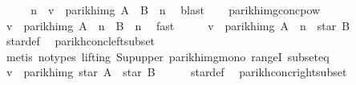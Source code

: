 \begin{isabellebody}
\ \ \isamarkupfalse%
\ \isamarkupfalse%
\ n\ \ {\isachardoublequoteopen}v\ {\isasymin}\ parikh{\isacharunderscore}{\kern0pt}img\ {\isacharparenleft}{\kern0pt}{\isacharparenleft}{\kern0pt}A\ {\isacharat}{\kern0pt}{\isacharat}{\kern0pt}\ B{\isacharparenright}{\kern0pt}\ {\isacharcircum}{\kern0pt}{\isacharcircum}{\kern0pt}\ n{\isacharparenright}{\kern0pt}{\isachardoublequoteclose}\ \isamarkupfalse%
\ blast\isanewline
\ \ \isamarkupfalse%
\ parikh{\isacharunderscore}{\kern0pt}img{\isacharunderscore}{\kern0pt}conc{\isacharunderscore}{\kern0pt}pow\ \isamarkupfalse%
\ {\isachardoublequoteopen}v\ {\isasymin}\ parikh{\isacharunderscore}{\kern0pt}img\ {\isacharparenleft}{\kern0pt}A\ {\isacharcircum}{\kern0pt}{\isacharcircum}{\kern0pt}\ n\ {\isacharat}{\kern0pt}{\isacharat}{\kern0pt}\ B\ {\isacharcircum}{\kern0pt}{\isacharcircum}{\kern0pt}\ n{\isacharparenright}{\kern0pt}{\isachardoublequoteclose}\ \isamarkupfalse%
\ fast\isanewline
\ \ \isamarkupfalse%
\ \isamarkupfalse%
\ {\isachardoublequoteopen}v\ {\isasymin}\ parikh{\isacharunderscore}{\kern0pt}img\ {\isacharparenleft}{\kern0pt}A\ {\isacharcircum}{\kern0pt}{\isacharcircum}{\kern0pt}\ n\ {\isacharat}{\kern0pt}{\isacharat}{\kern0pt}\ star\ B{\isacharparenright}{\kern0pt}{\isachardoublequoteclose}\isanewline
\ \ \ \ \isamarkupfalse%
\ star{\isacharunderscore}{\kern0pt}def\ \isamarkupfalse%
\ parikh{\isacharunderscore}{\kern0pt}conc{\isacharunderscore}{\kern0pt}left{\isacharunderscore}{\kern0pt}subset\isanewline
\ \ \ \ \isamarkupfalse%
\ {\isacharparenleft}{\kern0pt}metis\ {\isacharparenleft}{\kern0pt}no{\isacharunderscore}{\kern0pt}types{\isacharcomma}{\kern0pt}\ lifting{\isacharparenright}{\kern0pt}\ Sup{\isacharunderscore}{\kern0pt}upper\ parikh{\isacharunderscore}{\kern0pt}img{\isacharunderscore}{\kern0pt}mono\ rangeI\ subset{\isacharunderscore}{\kern0pt}eq{\isacharparenright}{\kern0pt}\isanewline
\ \ \isamarkupfalse%
\ \isamarkupfalse%
\ {\isachardoublequoteopen}v\ {\isasymin}\ parikh{\isacharunderscore}{\kern0pt}img\ {\isacharparenleft}{\kern0pt}star\ A\ {\isacharat}{\kern0pt}{\isacharat}{\kern0pt}\ star\ B{\isacharparenright}{\kern0pt}{\isachardoublequoteclose}\isanewline
\ \ \ \ \isamarkupfalse%
\ star{\isacharunderscore}{\kern0pt}def\ \isamarkupfalse%
\ parikh{\isacharunderscore}{\kern0pt}conc{\isacharunderscore}{\kern0pt}right{\isacharunderscore}{\kern0pt}subset\isanewline

\end{isabellebody}
